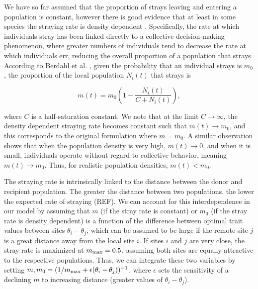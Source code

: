 \documentclass[twocolumn,preprintnumbers,amsmath,amssymb,superscriptaddress]{revtex4}
\begin{document}
\noindent We have so far assumed that the proportion of strays leaving and entering a population is constant, however there is good evidence that at least in some species the straying rate is density dependent \cite{Berdahl:2016dx,Bett:2017ha}.
Specifically, the rate at which individuals stray has been linked directly to a collective decision-making phenomenon, where greater numbers of individuals tend to decrease the rate at which individuals err, reducing the overall proportion of a population that strays.
According to Berdahl et al. \cite{Berdahl:2016dx}, given the probability that an individual strays is $m_0$, the proportion of the local population $N_i(t)$ that strays is

\begin{equation}
  m(t) = m_0\left(1- \frac{N_i(t)}{C+N_i(t)}\right),
  \label{eq:ddm}
\end{equation}

\noindent where $C$ is a half-saturation constant.
We note that at the limit $C\rightarrow \infty$, the density dependent straying rate becomes constant such that $m(t) \rightarrow m_0$, and this corresponds to the original formulation where $m=m_0$.
A similar observation shows that when the population density is very high, $m(t) \rightarrow 0$, and when it is small, individuals operate without regard to collective behavior, meaning $m(t) \rightarrow m_0$.
Thus, for realistic population densities, $m(t) < m_0$.


The straying rate is intrinsically linked to the distance between the donor and recipient population.
The greater the distance between two populations, the lower the expected rate of straying (REF).
We can account for this interdependence in our model by assuming that $m$ (if the stray rate is constant) or $m_0$ (if the stray rate is density dependent) is a function of the difference between optimal trait values between sites $\theta_i-\theta_j$, which can be assumed to be large if the remote site $j$ is a great distance away from the local site $i$.
If sites $i$ and $j$ are very close, the stray rate is maximized at $m_{\rm max} = 0.5$, assuming both sites are equally attractive to the respective populations.
Thus, we can integrate these two variables by setting $m,m_0 = (1/m_{\rm max} + \epsilon (\theta_i-\theta_j))^{-1}$, where $\epsilon$ sets the sensitivity of a declining $m$ to increasing distance (greater values of $\theta_i-\theta_j$).
\end{document}
